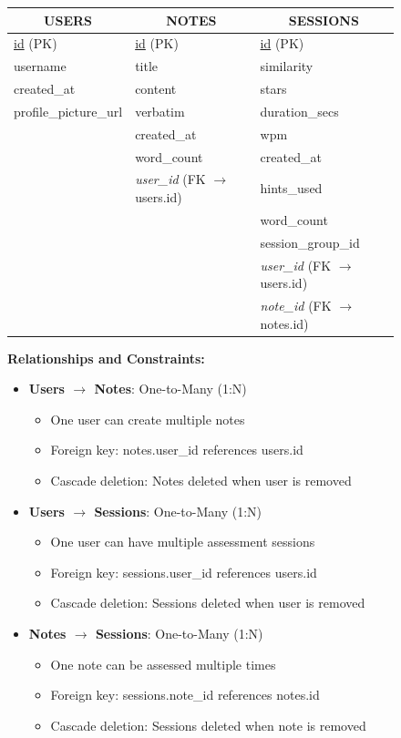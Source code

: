 {\begin{figure}[H]
\begin{minipage}{\textwidth}
\begin{tabular}{|l|l|l|}
\hline
\multicolumn{1}{|c|}{\textbf{USERS}} & \multicolumn{1}{|c|}{\textbf{NOTES}} & \multicolumn{1}{|c|}{\textbf{SESSIONS}} \\
\hline
\underline{id} (PK) & \underline{id} (PK) & \underline{id} (PK) \\
username & title & similarity \\
created\_at & content & stars \\
profile\_picture\_url & verbatim & duration\_secs \\
 & created\_at & wpm \\
 & word\_count & created\_at \\
 & \textit{user\_id} (FK $\rightarrow$ users.id) & hints\_used \\
 &  & word\_count \\
 &  & session\_group\_id \\
 &  & \textit{user\_id} (FK $\rightarrow$ users.id) \\
 &  & \textit{note\_id} (FK $\rightarrow$ notes.id) \\
\hline
\end{tabular}

\vspace{0.8cm}

\textbf{Relationships and Constraints:}
\begin{itemize}
\item \textbf{Users $\rightarrow$ Notes}: One-to-Many (1:N) 
\begin{itemize}
\item One user can create multiple notes
\item Foreign key: notes.user\_id references users.id
\item Cascade deletion: Notes deleted when user is removed
\end{itemize}
\item \textbf{Users $\rightarrow$ Sessions}: One-to-Many (1:N)
\begin{itemize}
\item One user can have multiple assessment sessions
\item Foreign key: sessions.user\_id references users.id
\item Cascade deletion: Sessions deleted when user is removed
\end{itemize}
\item \textbf{Notes $\rightarrow$ Sessions}: One-to-Many (1:N)
\begin{itemize}
\item One note can be assessed multiple times
\item Foreign key: sessions.note\_id references notes.id
\item Cascade deletion: Sessions deleted when note is removed
\end{itemize}
\end{itemize}


\end{minipage}
\end{figure}}

